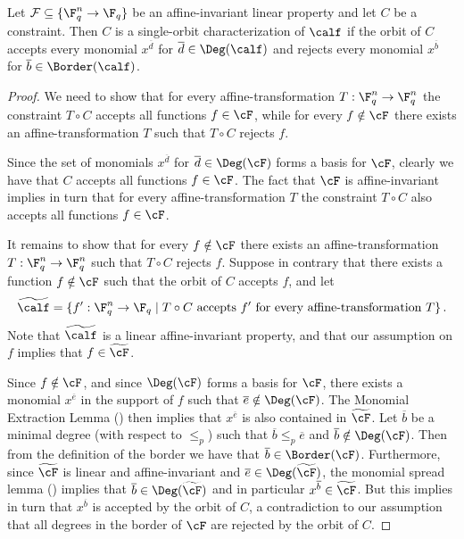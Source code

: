 \begin{lemma}\label{lem:border-single-orbit}
Let $\mathcal{F} \subseteq \{\F_q^n \to \F_q\}$ be an
affine-invariant linear property and let $C$ be a constraint.
Then $C$ is a single-orbit characterization of $\calf$ if the orbit of
$C$ accepts every monomial $x^{\overline d}$ for $\overline d \in \Deg(\calf)$ and
rejects every monomial $x^{\overline b}$ for $\overline b \in \Border(\calf)$.
\end{lemma}

\begin{proof}
We need to show that for every affine-transformation $T:\F_q^n \to \F_q^n$ the constraint $T \circ C$ accepts all functions $f \in \cF$,
while for every $f \notin \cF$ there exists an affine-transformation $T$ such that $T \circ C$ rejects $f$.

Since the set of monomials $x^{\overline d}$ for $\overline d \in \Deg(\cF)$ forms a basis for $\cF$, clearly we have that $C$ accepts all functions $f \in \cF$. The fact that $\cF$ is affine-invariant implies in turn that for every affine-transformation $T$ the constraint $T \circ C$ also accepts all functions $f \in \cF$.

It remains to show that for every $f \notin \cF$ there exists an affine-transformation $T: \F_q^n \to \F_q^n$ such that $T \circ C$ rejects $f$.
Suppose in contrary that there exists a function $f \notin \cF$ such that the orbit of $C$ accepts $f$, and
let \[{\widetilde \calf} = \{f' : \F_q^n \to \F_q \;|\;
T \circ C \text{~accepts~} f' \text{~for~every~affine-transformation~}T\}\,. \]
Note that $\widetilde \calf$ is a linear affine-invariant property, and that our assumption on $f$ implies that $f \in {\widetilde \cF}$.

Since $f \notin \cF$, and since $\Deg(\cF)$ forms a basis for $\cF$, there exists a monomial $x^{\overline e}$ in the support of $f$ such that $\overline e \notin \Deg(\cF)$. The 
%
Monomial Extraction Lemma %
() then implies that $x^{\overline e}$ is also contained in $\widetilde \cF$. Let $\overline b$ be a minimal degree (with respect to $\leq_p$) such that $\overline b \leq_p \overline e$ and $\overline b \notin \Deg(\cF)$. Then from the definition of the border we have that $\overline b \in \Border(\cF)$. Furthermore, since $\widetilde \cF$ is linear and affine-invariant and $\overline e \in \Deg({\widetilde \cF})$,
the monomial spread lemma () implies that $\overline b \in \Deg({\widetilde \cF})$ and in particular $x^{\overline b} \in \widetilde \cF$.
But this implies in turn that  $x^{\overline b}$ is accepted by the orbit of $C$, a contradiction to our assumption that all degrees in the 
%
border of
$\cF$ are rejected by the orbit of $C$.
\end{proof}

